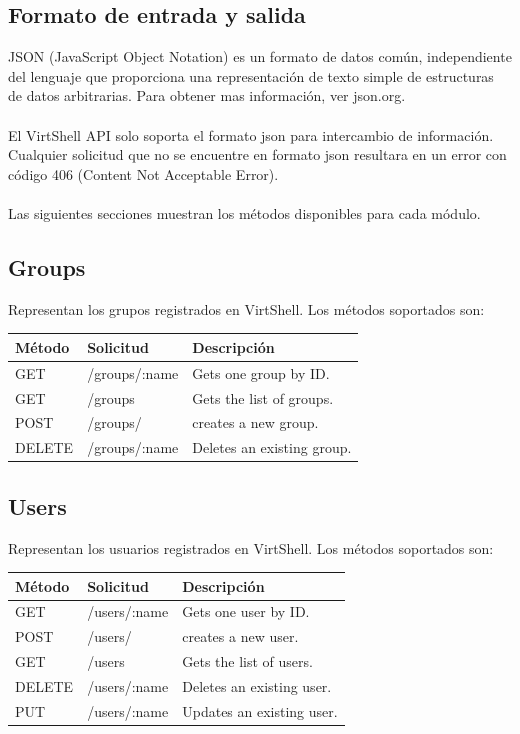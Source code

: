 \documentclass[conference, spanish]{IEEEtran}
\begin{document}
\subsection{Formato de entrada y salida}
JSON (JavaScript Object Notation) es un formato de datos común, independiente del lenguaje que proporciona una representación de texto simple de estructuras de datos arbitrarias. Para obtener mas información, ver json.org.\\
\\
El VirtShell API solo soporta el formato json para intercambio de información. Cualquier solicitud que no se encuentre en formato json resultara en un error con código 406 (Content Not Acceptable Error).\\
\\
Las siguientes secciones muestran los métodos disponibles para cada módulo.\\

\subsection{Groups}
Representan los grupos registrados en VirtShell. Los métodos soportados son:

\begin{center}
 \small
 \begin{tabular}{| l | l | l |}
 \hline
  \textbf{Método} & \textbf{Solicitud} & \textbf{Descripción} \\ [0.5ex] 
  \hline\hline
  GET & /groups/:name & Gets one group by ID. \\
  \hline
  GET & /groups & Gets the list of groups. \\  
  \hline
  POST & /groups/ & creates a new group. \\
  \hline
  DELETE & /groups/:name & Deletes an existing group. \\
  \hline
\end{tabular}
\end{center}

\subsection{Users}
Representan los usuarios registrados en VirtShell. Los métodos soportados son:

\begin{center}
 \small
 \begin{tabular}{| l | l | l |}
 \hline
  \textbf{Método} & \textbf{Solicitud} & \textbf{Descripción} \\ [0.5ex] 
  \hline\hline
  GET & /users/:name & Gets one user by ID. \\
  \hline
  POST & /users/ & creates a new user. \\
  \hline
  GET & /users & Gets the list of users. \\  
  \hline
  DELETE & /users/:name & Deletes an existing user. \\
  \hline  
  PUT & /users/:name & Updates an existing user. \\ [1ex]  
  \hline
\end{tabular}
\end{center}
\end{document}
